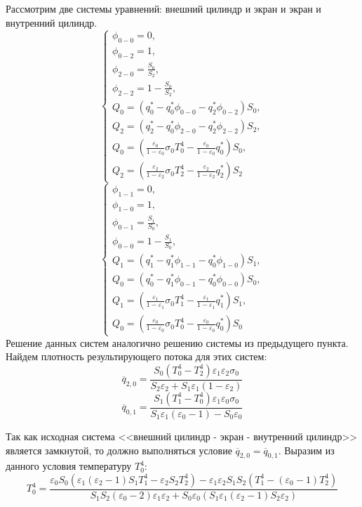 \documentclass[12pt, a4paper]{article}
\begin{document}
Рассмотрим две системы уравнений: внешний цилиндр и экран и экран и внутренний цилиндр.
\begin{equation*}
	\begin{cases}
		\phi_{0-0} = 0, \\
		\phi_{0-2} = 1, \\
		\phi_{2-0} = \frac{S_0}{S_2}, \\
		\phi_{2-2} = 1 - \frac{S_0}{S_2},\\
		Q_0 = (q_0^{*} - q_0^{*} \phi_{0-0} - q_2^{*} \phi_{0-2})S_0, \\
		Q_2 = (q_2^{*} - q_0^{*}\phi_{2-0} - q_2^{*} \phi_{2-2})S_2, \\
		Q_0 = (\frac{\varepsilon_0}{1- \varepsilon_0}\sigma_0 T_0^4 - \frac{\varepsilon_0}{1-\varepsilon_0}q_0^{*})S_0, \\
		Q_2 = (\frac{\varepsilon_2}{1-\varepsilon_2} \sigma_0 T_2^4 - \frac{\varepsilon_2}{1 - \varepsilon_2}q_2^{*}) S_2
	\end{cases}
\end{equation*}
\begin{equation*}
	\begin{cases}
		\phi_{1-1} = 0, \\
		\phi_{1-0} = 1, \\
		\phi_{0-1} = \frac{S_1}{S_0}, \\
		\phi_{0-0} = 1 - \frac{S_1}{S_0},\\
		Q_1 = (q_1^{*} - q_1^{*} \phi_{1-1} - q_0^{*} \phi_{1-0})S_1, \\
		Q_0 = (q_0^{*} - q_1^{*}\phi_{0-1} - q_0^{*} \phi_{0-0})S_0, \\
		Q_1 = (\frac{\varepsilon_1}{1- \varepsilon_1}\sigma_0 T_1^4 - \frac{\varepsilon_1}{1-\varepsilon_1}q_1^{*})S_1, \\
		Q_0 = (\frac{\varepsilon_0}{1-\varepsilon_0} \sigma_0 T_0^4 - \frac{\varepsilon_0}{1 - \varepsilon_0}q_0^{*}) S_0
	\end{cases}
\end{equation*}
Решение данных систем аналогично решению системы из предыдущего пункта.
Найдем плотность результирующего потока для этих систем:
\[
\overline{q}_{2, 0} = \frac{S_0 (T_0^4 - T_2^4) \varepsilon_1 \varepsilon_2 \sigma_0}{S_2 \varepsilon_2 + S_1 \varepsilon_1 (1 - \varepsilon_2)}
\]
\[
\overline{q}_{0, 1} = \frac{S_1 (T_1^4 - T_0^4) \varepsilon_1 \varepsilon_0 \sigma_0}{S_1 \varepsilon_1 (\varepsilon_0 - 1) - S_0 \varepsilon_0}
\]

Так как исходная система <<внешний цилиндр - экран - внутренний цилиндр>> является замкнутой, то должно выполняться условие $\overline{q}_{2, 0} = \overline{q}_{0, 1}$. Выразим из данного условия температуру $T_0^4$:
\[
T^4_0 = \frac{\varepsilon_0 S_0 (\varepsilon_1 (\varepsilon_2 - 1) S_1 T_1^4 - \varepsilon_2 S_2 T^4_2) - \varepsilon_1 \varepsilon_2 S_1 S_2 (T_1^4 - (\varepsilon_0 - 1) T^4_2)}{S_1 S_2 (\varepsilon_0 - 2) \varepsilon_1 \varepsilon_2 + S_0 \varepsilon_0 (S_1 \varepsilon_1(\varepsilon_2 -1 ) S_2 \varepsilon_2)}
\]
\end{document}
